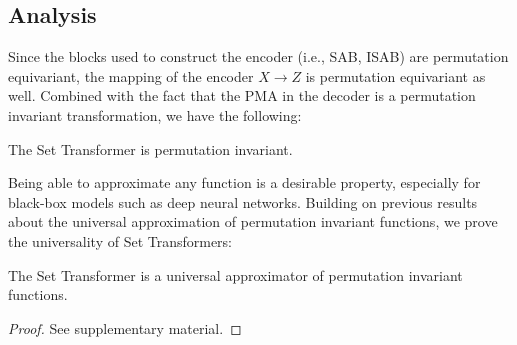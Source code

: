 \subsection{Analysis}
\label{subsec:analysis}
Since the blocks used to construct the encoder (i.e., SAB, ISAB) are permutation equivariant, the mapping of the encoder $X \rightarrow Z$ is permutation equivariant as well.
Combined with the fact that the PMA in the decoder is a permutation invariant transformation, we have the following:
\begin{proposition}
The Set Transformer is permutation invariant.
\end{proposition}

Being able to approximate any function is a desirable property, especially for black-box models such as deep neural networks.
Building on previous results about the universal approximation of permutation invariant functions, we prove the universality of Set Transformers:
\begin{proposition}
The Set Transformer is a universal approximator of permutation invariant functions.
\end{proposition}
\begin{proof}
See supplementary material.
\end{proof}
